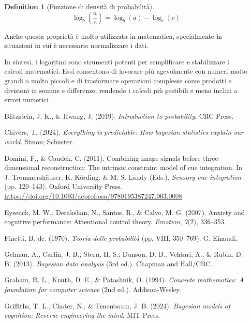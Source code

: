 \documentclass[
  letterpaper,
  DIV=11,
  numbers=noendperiod,
  oneside]{scrreprt}
\newlength{\cslhangindent}
\newenvironment{CSLReferences}[2] %
 {\begin{list}{}{%
  \setlength{\itemindent}{0pt}
  \setlength{\leftmargin}{0pt}
  \setlength{\parsep}{0pt}
  \ifodd #1
   \setlength{\leftmargin}{\cslhangindent}
   \setlength{\itemindent}{-1\cslhangindent}
  \fi
  \setlength{\itemsep}{#2\baselineskip}}}
 {\end{list}}
\theoremstyle{definition}
\theoremstyle{plain}
\theoremstyle{definition}
\newtheorem{definition}{Definition}[chapter]
\theoremstyle{remark}
\begin{document}
\begin{definition}[Funzione di densità di
probabilità]
\[
\log_b\left(\frac{a}{c}\right) = \log_b(a) - \log_b(c)
\]

Anche questa proprietà è molto utilizzata in matematica, specialmente in
situazioni in cui è necessario normalizzare i dati.

In sintesi, i logaritmi sono strumenti potenti per semplificare e
stabilizzare i calcoli matematici. Essi consentono di lavorare più
agevolmente con numeri molto grandi o molto piccoli e di trasformare
operazioni complesse come prodotti e divisioni in somme e differenze,
rendendo i calcoli più gestibili e meno inclini a errori numerici.

\end{definition}

\label{refs}
\begin{CSLReferences}{1}{0}
Blitzstein, J. K., \& Hwang, J. (2019). \emph{Introduction to
probability}. CRC Press.

Chivers, T. (2024). \emph{Everything is predictable: How bayesian
statistics explain our world}. Simon; Schuster.

Domini, F., \& Caudek, C. (2011). Combining image signals before
three-dimensional reconstruction: The intrinsic constraint model of cue
integration. In J. Trommershäuser, K. Körding, \& M. S. Landy (Eds.),
\emph{Sensory cue integration} (pp. 120--143). Oxford University Press.
\url{https://doi.org/10.1093/acprof:oso/9780195387247.003.0008}

Eysenck, M. W., Derakshan, N., Santos, R., \& Calvo, M. G. (2007).
Anxiety and cognitive performance: Attentional control theory.
\emph{Emotion}, \emph{7}(2), 336--353.

Finetti, B. de. (1970). \emph{Teoria delle probabilità} (pp. VIII,
350--769). G. Einaudi.

Gelman, A., Carlin, J. B., Stern, H. S., Dunson, D. B., Vehtari, A., \&
Rubin, D. B. (2013). \emph{Bayesian data analysis} (3rd ed.). {Chapman
and Hall/CRC}.

Graham, R. L., Knuth, D. E., \& Patashnik, O. (1994). \emph{Concrete
mathematics: A foundation for computer science} (2nd ed.).
Addison-Wesley.

Griffiths, T. L., Chater, N., \& Tenenbaum, J. B. (2024). \emph{Bayesian
models of cognition: Reverse engineering the mind}. MIT Press.


\end{CSLReferences}
\end{document}
